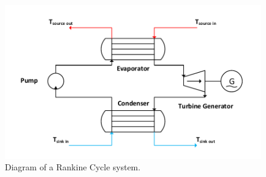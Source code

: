 \begin{figure}[h]
	\centering
	\caption{Diagram of a Rankine Cycle system.}
	\label{fig:rankine_cycle_diagram}
	

	\includegraphics[width=\textwidth]{figures/RankineCycleDiagram.pdf}

\end{figure}